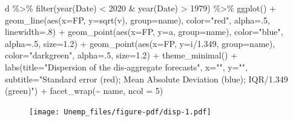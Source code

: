 \documentclass[
  letterpaper,
]{book}
\newenvironment{Shaded}{\begin{snugshade}}{\end{snugshade}}
\newcommand{\AttributeTok}[1]{\textcolor[rgb]{0.40,0.45,0.13}{#1}}
\newcommand{\DecValTok}[1]{\textcolor[rgb]{0.68,0.00,0.00}{#1}}
\newcommand{\FloatTok}[1]{\textcolor[rgb]{0.68,0.00,0.00}{#1}}
\newcommand{\FunctionTok}[1]{\textcolor[rgb]{0.28,0.35,0.67}{#1}}
\newcommand{\NormalTok}[1]{\textcolor[rgb]{0.00,0.23,0.31}{#1}}
\newcommand{\SpecialCharTok}[1]{\textcolor[rgb]{0.37,0.37,0.37}{#1}}
\newcommand{\StringTok}[1]{\textcolor[rgb]{0.13,0.47,0.30}{#1}}
\begin{document}
\begin{Shaded}
\begin{Highlighting}[]
\NormalTok{d }\SpecialCharTok{\%\textgreater{}\%} 
  \FunctionTok{filter}\NormalTok{(}\FunctionTok{year}\NormalTok{(Date) }\SpecialCharTok{\textless{}} \DecValTok{2020} \SpecialCharTok{\&} \FunctionTok{year}\NormalTok{(Date) }\SpecialCharTok{\textgreater{}} \DecValTok{1979}\NormalTok{) }\SpecialCharTok{\%\textgreater{}\%}
  \FunctionTok{ggplot}\NormalTok{() }\SpecialCharTok{+} 
  \FunctionTok{geom\_line}\NormalTok{(}\FunctionTok{aes}\NormalTok{(}\AttributeTok{x=}\NormalTok{FP, }\AttributeTok{y=}\FunctionTok{sqrt}\NormalTok{(v), }\AttributeTok{group=}\NormalTok{name), }\AttributeTok{color=}\StringTok{"red"}\NormalTok{, }\AttributeTok{alpha=}\NormalTok{.}\DecValTok{5}\NormalTok{, }\AttributeTok{linewidth=}\NormalTok{.}\DecValTok{8}\NormalTok{) }\SpecialCharTok{+} 
  \FunctionTok{geom\_point}\NormalTok{(}\FunctionTok{aes}\NormalTok{(}\AttributeTok{x=}\NormalTok{FP, }\AttributeTok{y=}\NormalTok{a, }\AttributeTok{group=}\NormalTok{name), }\AttributeTok{color=}\StringTok{"blue"}\NormalTok{, }\AttributeTok{alpha=}\NormalTok{.}\DecValTok{5}\NormalTok{, }\AttributeTok{size=}\FloatTok{1.2}\NormalTok{) }\SpecialCharTok{+} 
  \FunctionTok{geom\_point}\NormalTok{(}\FunctionTok{aes}\NormalTok{(}\AttributeTok{x=}\NormalTok{FP, }\AttributeTok{y=}\NormalTok{i}\SpecialCharTok{/}\FloatTok{1.349}\NormalTok{, }\AttributeTok{group=}\NormalTok{name), }\AttributeTok{color=}\StringTok{"darkgreen"}\NormalTok{, }\AttributeTok{alpha=}\NormalTok{.}\DecValTok{5}\NormalTok{, }\AttributeTok{size=}\FloatTok{1.2}\NormalTok{) }\SpecialCharTok{+} 
  \FunctionTok{theme\_minimal}\NormalTok{() }\SpecialCharTok{+}
  \FunctionTok{labs}\NormalTok{(}\AttributeTok{title=}\StringTok{"Dispersion of the dis{-}aggregate forecasts"}\NormalTok{, }\AttributeTok{x=}\StringTok{""}\NormalTok{, }\AttributeTok{y=}\StringTok{""}\NormalTok{,}
       \AttributeTok{subtitle=}\StringTok{"Standard error (red); Mean Absolute Deviation (blue); IQR/1.349 (green)"}\NormalTok{) }\SpecialCharTok{+}
  \FunctionTok{facet\_wrap}\NormalTok{(}\SpecialCharTok{\textasciitilde{}}\NormalTok{ name, }\AttributeTok{ncol =} \DecValTok{5}\NormalTok{)}
\end{Highlighting}
\end{Shaded}

\begin{figure}[H]

{\centering \texttt{[image: Unemp\_files/figure-pdf/disp-1.pdf]}

}

\end{figure}
\end{document}
